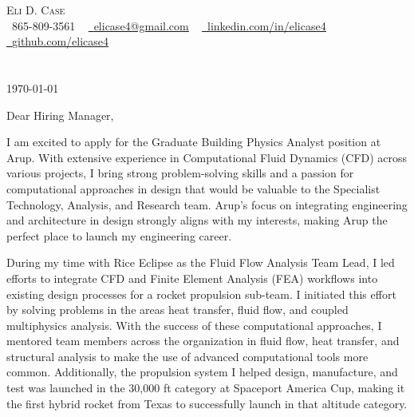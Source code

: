 \documentclass[letterpaper,11pt]{letter}
\newcommand{\paragraphbreak}{\vspace{5pt}}
\begin{document}
\begin{center}
    {\large \scshape Eli D. Case} \\ \vspace{1pt}
    \small \raisebox{-0.1\height}\faPhone\ 865-809-3561 ~ \href{mailto:elicase4@gmail.com}{\raisebox{-0.2\height}\faEnvelope\  \underline{elicase4@gmail.com}} ~ 
    \href{https://linkedin.com/in/elicase4}{\raisebox{-0.2\height}\faLinkedin\ \underline{linkedin.com/in/elicase4}}  ~
    \href{https://github.com/elicase4}{\raisebox{-0.2\height}\faGithub\ \underline{github.com/elicase4}}
    \vspace{-4pt}
\end{center}

\section{}

\today \\

\paragraphbreak

Dear Hiring Manager,

\paragraphbreak

I am excited to apply for the Graduate Building Physics Analyst position at Arup. With extensive experience in Computational Fluid Dynamics (CFD) across various projects, I bring strong problem-solving skills and a passion for computational approaches in design that would be valuable to the Specialist Technology, Analysis, and Research team. Arup's focus on integrating engineering and architecture in design strongly aligns with my interests, making Arup the perfect place to launch my engineering career.

\paragraphbreak

During my time with Rice Eclipse as the Fluid Flow Analysis Team Lead, I led efforts to integrate CFD and Finite Element Analysis (FEA) workflows into existing design processes for a rocket propulsion sub-team. I initiated this effort by solving problems in the areas heat transfer, fluid flow, and coupled multiphysics analysis. With the success of these computational approaches, I mentored team members across the organization in fluid flow, heat transfer, and structural analysis to make the use of advanced computational tools more common. Additionally, the propulsion system I helped design, manufacture, and test was launched in the 30,000 ft category at Spaceport America Cup, making it the first hybrid rocket from Texas to successfully launch in that altitude category.
\end{document}
